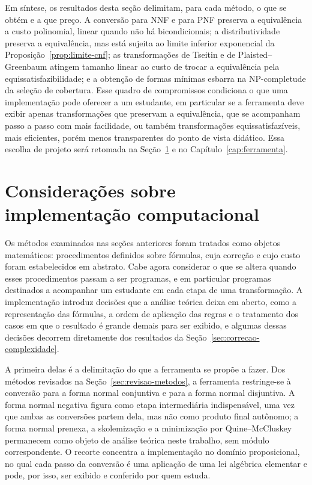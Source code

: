\documentclass[12pt,a4paper,oneside]{report}
\theoremstyle{tituloplain}
\theoremstyle{titulodef}
\begin{document}
Em síntese, os resultados desta seção delimitam, para cada método, o que se obtém e a que preço. A conversão para NNF e para PNF preserva a equivalência a custo polinomial, linear quando não há bicondicionais; a distributividade preserva a equivalência, mas está sujeita ao limite inferior exponencial da Proposição~\ref{prop:limite-cnf}; as transformações de Tseitin e de Plaisted--Greenbaum atingem tamanho linear ao custo de trocar a equivalência pela equissatisfazibilidade; e a obtenção de formas mínimas esbarra na NP-completude da seleção de cobertura. Esse quadro de compromissos condiciona o que uma implementação pode oferecer a um estudante, em particular se a ferramenta deve exibir apenas transformações que preservam a equivalência, que se acompanham passo a passo com mais facilidade, ou também transformações equissatisfazíveis, mais eficientes, porém menos transparentes do ponto de vista didático. Essa escolha de projeto será retomada na Seção~\ref{sec:implementacao-computacional} e no Capítulo~\ref{cap:ferramenta}.

\section{Considerações sobre implementação computacional}\label{sec:implementacao-computacional}

Os métodos examinados nas seções anteriores foram tratados como objetos matemáticos: procedimentos definidos sobre fórmulas, cuja correção e cujo custo foram estabelecidos em abstrato. Cabe agora considerar o que se altera quando esses procedimentos passam a ser programas, e em particular programas destinados a acompanhar um estudante em cada etapa de uma transformação. A implementação introduz decisões que a análise teórica deixa em aberto, como a representação das fórmulas, a ordem de aplicação das regras e o tratamento dos casos em que o resultado é grande demais para ser exibido, e algumas dessas decisões decorrem diretamente dos resultados da Seção~\ref{sec:correcao-complexidade}.

A primeira delas é a delimitação do que a ferramenta se propõe a fazer. Dos métodos revisados na Seção~\ref{sec:revisao-metodos}, a ferramenta restringe-se à conversão para a forma normal conjuntiva e para a forma normal disjuntiva. A forma normal negativa figura como etapa intermediária indispensável, uma vez que ambas as conversões partem dela, mas não como produto final autônomo; a forma normal prenexa, a skolemização e a minimização por Quine--McCluskey permanecem como objeto de análise teórica neste trabalho, sem módulo correspondente. O recorte concentra a implementação no domínio proposicional, no qual cada passo da conversão é uma aplicação de uma lei algébrica elementar e pode, por isso, ser exibido e conferido por quem estuda.
\end{document}
